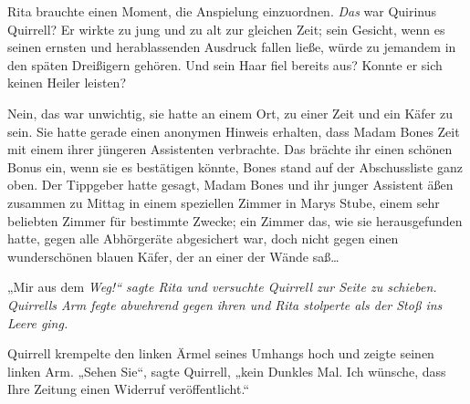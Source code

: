 Rita brauchte einen Moment, die Anspielung einzuordnen. \emph{Das} war Quirinus Quirrell? Er wirkte zu jung und zu alt zur gleichen Zeit; sein Gesicht, wenn es seinen ernsten und herablassenden Ausdruck fallen ließe, würde zu jemandem in den späten Dreißigern gehören. Und sein Haar fiel bereits aus? Konnte er sich keinen Heiler leisten?

Nein, das war unwichtig, sie hatte an einem Ort, zu einer Zeit und ein Käfer zu sein. Sie hatte gerade einen anonymen Hinweis erhalten, dass Madam Bones Zeit mit einem ihrer jüngeren Assistenten verbrachte. Das brächte ihr einen schönen Bonus ein, wenn sie es bestätigen könnte, Bones stand auf der Abschussliste ganz oben. Der Tippgeber hatte gesagt, Madam Bones und ihr junger Assistent äßen zusammen zu Mittag in einem speziellen Zimmer in Marys Stube, einem sehr beliebten Zimmer für bestimmte Zwecke; ein Zimmer das, wie sie herausgefunden hatte, gegen alle Abhörgeräte abgesichert war, doch nicht gegen einen wunderschönen blauen Käfer, der an einer der Wände saß…

„Mir aus dem \emph{Weg!“ sagte Rita und versuchte Quirrell zur Seite zu schieben. Quirrells Arm fegte abwehrend gegen ihren und Rita stolperte als der Stoß ins Leere ging.}

Quirrell krempelte den linken Ärmel seines Umhangs hoch und zeigte seinen linken Arm. „Sehen Sie“, sagte Quirrell, „kein Dunkles Mal. Ich wünsche, dass Ihre Zeitung einen Widerruf veröffentlicht.“

